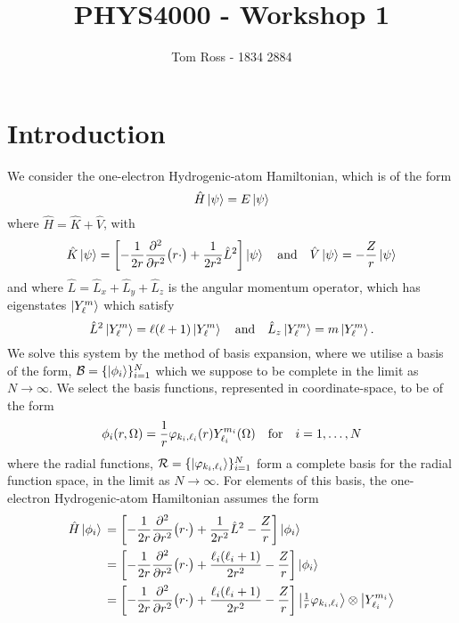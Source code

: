 \documentclass[]{article}
\title{PHYS4000 - Workshop 1}
\author{Tom Ross - 1834 2884}
\date{}
\begin{document}
\section{Introduction}
\label{sec:introduction}

We consider the one-electron Hydrogenic-atom Hamiltonian, which is of the form
\begin{equation*}
  \hat{H}
  \ket{\psi}
  =
  E
  \ket{\psi}
\end{equation*}
where $\hat{H} = \hat{K} + \hat{V}$, with
\begin{equation*}
  \hat{K}
  \ket{\psi}
  =
  \lrsq[\bigg]
  {
    -
    \dfrac{1}{2 r}
    \pdv[2]{r}
    \lr[\big]
    {
      r
      \cdot
    }
    +
    \dfrac{1}{2 r^{2}}
    \hat{L}^{2}
  }
  \ket{\psi}
  \qq{and}
  \hat{V}
  \ket{\psi}
  =
  -
  \dfrac{Z}{r}
  \ket{\psi}
\end{equation*}
and where $\hat{L} = \hat{L}_{x} + \hat{L}_{y} + \hat{L}_{z}$ is the angular
momentum operator, which has eigenstates $\ket{Y_{\ell}^{m}}$ which satisfy
\begin{equation*}
  \hat{L}^{2}
  \ket{Y_{\ell}^{m}}
  =
  \ell
  \lr{\ell + 1}
  \ket{Y_{\ell}^{m}}
  \qq{and}
  \hat{L}_{z}
  \ket{Y_{\ell}^{m}}
  =
  m
  \ket{Y_{\ell}^{m}}
  .
\end{equation*}
We solve this system by the method of basis expansion, where we utilise a basis
of the form, $\mathcal{B} = \lrset{\ket{\phi_{i}}}_{i = 1}^{N}$ which we suppose
to be complete in the limit as $N \to \infty$.
We select the basis functions, represented in coordinate-space, to be of the
form
\begin{equation*}
  \phi_{i}\lr{r, \Omega}
  =
  \dfrac{1}{r}
  \varphi_{k_{i}, \ell_{i}}\lr{r}
  Y_{\ell_{i}}^{m_{i}}\lr{\Omega}
  \qq{for}
  i = 1, \dotsc, N
\end{equation*}
where the radial functions,
$\mathcal{R} = \lrset{\ket{\varphi_{k_{i}, \ell_{i}}}}_{i = 1}^{N}$ form a
complete basis for the radial function space, in the limit as $N \to \infty$.
For elements of this basis, the one-electron Hydrogenic-atom Hamiltonian assumes
the form
\begin{alignat*}{2}
  \hat{H}
  \ket{\phi_{i}}
  {}={}
  &
  \lrsq[\bigg]
  {
    -
    \dfrac{1}{2 r}
    \pdv[2]{r}
    \lr[\big]
    {
      r
      \cdot
    }
    +
    \dfrac{1}{2 r^{2}}
    \hat{L}^{2}
    -
    \dfrac{Z}{r}
  }
  \ket{\phi_{i}}
  \\
  {}={}
  &
  \lrsq[\bigg]
  {
    -
    \dfrac{1}{2 r}
    \pdv[2]{r}
    \lr[\big]
    {
      r
      \cdot
    }
    +
    \dfrac
    {
      \ell_{i}
      \lr{\ell_{i} + 1}
    }
    {
      2
      r^{2}
    }
    -
    \dfrac{Z}{r}
  }
  \ket{\phi_{i}}
  \\
  {}={}
  &
  \lrsq[\bigg]
  {
    -
    \dfrac{1}{2 r}
    \pdv[2]{r}
    \lr[\big]
    {
      r
      \cdot
    }
    +
    \dfrac
    {
      \ell_{i}
      \lr{\ell_{i} + 1}
    }
    {
      2
      r^{2}
    }
    -
    \dfrac{Z}{r}
  }
  \ket{\tfrac{1}{r}\varphi_{k_{i}, \ell_{i}}}
  \otimes
  \ket{Y_{\ell_{i}}^{m_{i}}}
\end{alignat*}
\end{document}

